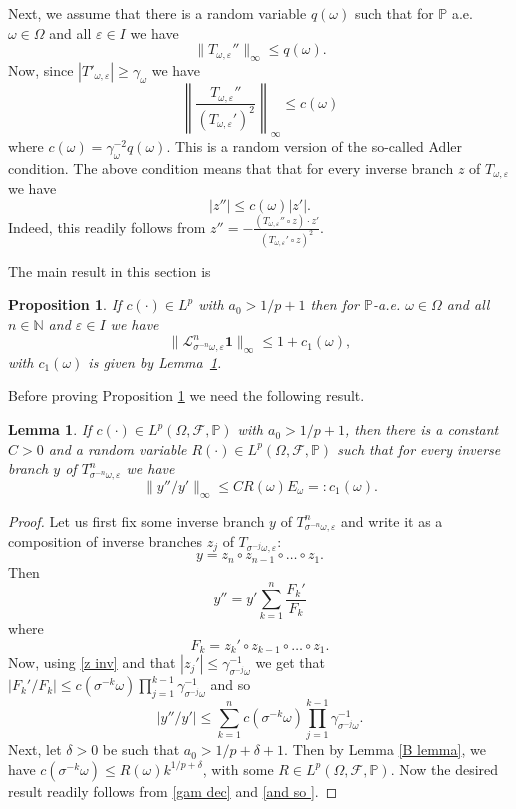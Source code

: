 \documentclass[11pt,reqno,a4paper]{article}
\newtheorem{proposition}[theorem]{Proposition}
\newtheorem{lemma}[theorem]{Lemma}
\theoremstyle{special}
\def\N{\mathbb{N}}
\def\om{\omega}
\begin{document}
Next, we assume that there is a random variable $q(\om)$ such that for $\mathbb P$ a.e. $\om  \in \Omega$ and all $\varepsilon \in I$ we have 
\begin{equation}\label{q bound}
\|T_{\om, \varepsilon}''\|_\infty\leq q(\om).    
\end{equation}
Now, since  $|T'_{\om, \varepsilon}|\geq \gamma_\om$ we have 
$$
\left\|\frac{T_{\om, \varepsilon}''}{(T_{\om, \varepsilon}')^2}\right\|_\infty\leq c(\omega)
$$
where
$
c(\om)=\gamma_\om^{-2}q(\om).
$
This is a random version of the so-called Adler condition. The above condition means that 
 that  for every inverse branch $z$ of $T_{\om, \varepsilon}$ we have 
\begin{equation}\label{z inv}
  |z''|\leq c(\omega)|z'|.  
\end{equation}
Indeed, this readily follows from $z''=-\frac{(T_{\om, \varepsilon}''\circ z)\cdot z'}{(T_{\om, \varepsilon}'\circ z)^2}$.


The main result in this section is 
\begin{proposition}\label{Sec3.2 Main}
If $c(\cdot)\in L^p$ with $a_0>1/p+1$ then for $\mathbb P$-a.e. $\om \in \Omega$ and all $n\in\N$ and $\varepsilon\in I$ we have 
$$
\|\mathcal L_{\sigma^{-n}\omega, \varepsilon}^n\mathbf {1}\|_\infty\leq 1+c_1(\om),
$$
with $c_1(\om)$  is given by Lemma~\ref{FL}.
\end{proposition}


Before proving Proposition \ref{Sec3.2 Main} we need the following result.
\begin{lemma}\label{FL}
If $c(\cdot)\in L^p (\Omega, \mathcal F, \mathbb P)$ with $a_0>1/p+1$, then there is a constant $C>0$ and a random variable $R(\cdot) \in L^p(\Omega, \mathcal F, \mathbb P)$ such that for every inverse branch $y$ of $T_{\sigma^{-n}\omega, \varepsilon}^n$ we have
$$
\|y''/y'\|_\infty\leq C R(\omega)E_\omega=:c_1(\omega).
$$
\end{lemma}
\begin{proof}
Let us first fix some inverse branch $y$  of $T_{\sigma^{-n} \om, \varepsilon}^n$ and write it as a composition of inverse branches  $z_j$ of $T_{\sigma^{-j}\omega, \varepsilon}$:
$$
y=z_n\circ z_{n-1}\circ\ldots \circ z_1.
$$
Then 
$$
y''=y'\sum_{k=1}^n\frac{F_k'}{F_k}
$$
where 
$$
F_k=z_k'\circ z_{k-1}\circ \ldots\circ z_1. 
$$
Now, using \eqref{z inv} and that $|z_j'|\leq \gamma_{\sigma^{-j}\omega}^{-1}$ we get that 
$
|F_k'/F_k|\leq c(\sigma^{-k}\omega)\prod_{j=1}^{k-1}\gamma_{\sigma^{-j}\omega}^{-1}
$
and so 
\begin{equation}\label{and so }
|y''/y'|\leq \sum_{k=1}^n c(\sigma^{-k}\omega)\prod_{j=1}^{k-1}\gamma_{\sigma^{-j}\omega}^{-1}.    
\end{equation}
Next, let $\delta>0$ be such that $a_0>1/p+\delta+1$. Then by Lemma \ref{B lemma}, we have $c(\sigma^{-k}\omega)\leq R(\omega)k^{1/p+\delta}$, with  some $R\in L^p(\Omega, \mathcal F, \mathbb P)$. Now the desired result readily follows from \eqref{gam dec} and \eqref{and so }.
\end{proof}
\end{document}
